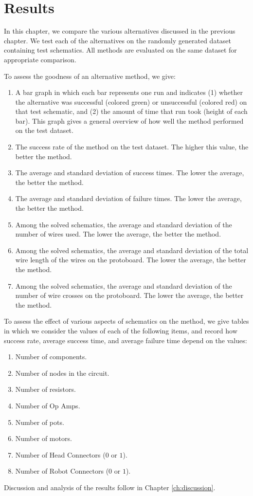 
\chapter{Results}
\label{ch:results}

In this chapter, we compare the various alternatives discussed in the previous
chapter. We test each of the alternatives on the randomly generated dataset
containing \q test schematics. All methods are evaluated on the same dataset for
appropriate comparison.

To assess the goodness of an alternative method, we give:
\begin{enumerate}
\item A bar graph in which each bar represents one run and indicates (1) whether
the alternative was successful (colored green) or unsuccessful (colored red)  on
that test schematic, and (2) the amount of time that run took (height of each
bar). This graph gives a general overview of how well the method performed on
the test dataset.
\item The success rate of the method on the test dataset. The higher this value,
the better the method.
\item The average and standard deviation of success times. The lower the average,
the better the method.
\item The average and standard deviation of failure times. The lower the average,
the better the method.
\item Among the solved schematics, the average and standard deviation of the
number of wires used. The lower the average, the better the method.
\item Among the solved schematics, the average and standard deviation of the
total wire length of the wires on the protoboard. The lower the average, the
better the method.
\item Among the solved schematics, the average and standard deviation of the
number of wire crosses on the protoboard. The lower the average, the better the
method.
\end{enumerate}

To assess the effect of various aspects of schematics on the method, we give
tables in which we consider the values of each of the following items, and
record how success rate, average success time, and average failure time depend on the values:
\begin{enumerate}
\item Number of components.
\item Number of nodes in the circuit.
\item Number of resistors.
\item Number of Op Amps.
\item Number of pots.
\item Number of motors.
\item Number of Head Connectors ($0$ or $1$).
\item Number of Robot Connectors ($0$ or $1$).
\end{enumerate}

Discussion and analysis of the results follow in Chapter \ref{ch:discussion}.
